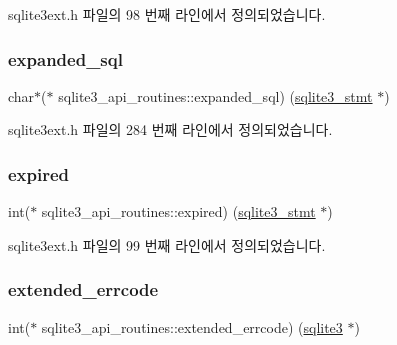 sqlite3ext.\+h 파일의 98 번째 라인에서 정의되었습니다.

\mbox{\label{structsqlite3__api__routines_a4bfc71a1304d1a5ade7dae8255f933a4}} 
\subsubsection{\texorpdfstring{expanded\+\_\+sql}{expanded\_sql}}
{\footnotesize\ttfamily char$\ast$($\ast$ sqlite3\+\_\+api\+\_\+routines\+::expanded\+\_\+sql) (\hyperlink{sqlite3_8h_af2a033da1327cdd77f0a174a09aedd0c}{sqlite3\+\_\+stmt} $\ast$)}



sqlite3ext.\+h 파일의 284 번째 라인에서 정의되었습니다.

\mbox{\label{structsqlite3__api__routines_aaf5ef34c7b325eefb8459224a5c926e8}} 
\subsubsection{\texorpdfstring{expired}{expired}}
{\footnotesize\ttfamily int($\ast$ sqlite3\+\_\+api\+\_\+routines\+::expired) (\hyperlink{sqlite3_8h_af2a033da1327cdd77f0a174a09aedd0c}{sqlite3\+\_\+stmt} $\ast$)}



sqlite3ext.\+h 파일의 99 번째 라인에서 정의되었습니다.

\mbox{\label{structsqlite3__api__routines_a4dc19fae70a22f0bce829e7be36bea3a}} 
\subsubsection{\texorpdfstring{extended\+\_\+errcode}{extended\_errcode}}
{\footnotesize\ttfamily int($\ast$ sqlite3\+\_\+api\+\_\+routines\+::extended\+\_\+errcode) (\hyperlink{sqlite3_8h_a0ef6f2646262c8a9b24368d8ac140f69}{sqlite3} $\ast$)}



